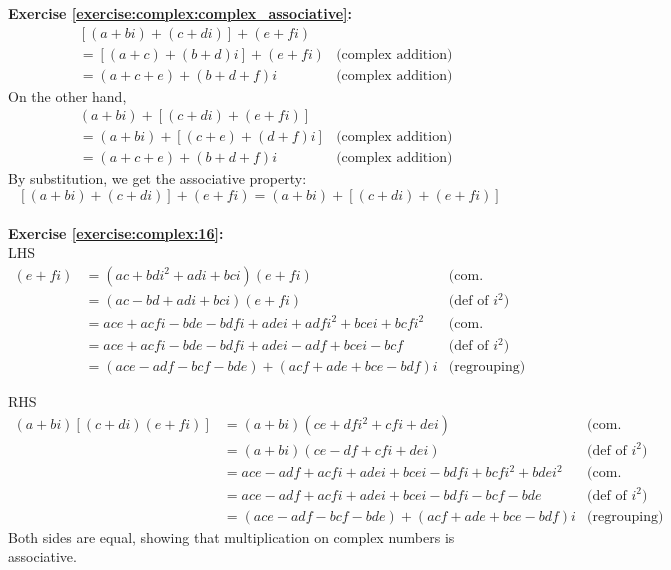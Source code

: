 \noindent\textbf{Exercise \ref{exercise:complex:complex_associative}:}
\begin{align*}
& [(a + bi) + (c + di)] + (e + fi) &\\
&=[(a + c) + (b + d)i] + (e + fi) &\text{(complex addition)}\\
&= (a + c + e) + (b + d + f)i &\text{(complex addition)}
\end{align*}
On the other hand,
\begin{align*}
&(a + bi) + [(c + di) + (e + fi)]&\\
 &= (a + bi) + [(c + e) + (d + f)i] &\text{(complex addition)}\\
&= (a + c + e) + (b + d + f)i &\text{(complex addition)}
\end{align*}
By substitution, we get the associative property:
\[[(a + bi) + (c + di)] + (e + fi) = (a + bi) + [(c + di) + (e + fi)] \] \\

\noindent\textbf{Exercise \ref{exercise:complex:16}:}
\\
LHS
\begin{align*}
[(a + bi)(c + di)](e + fi) &= (ac + bdi^{2} + adi + bci)(e + fi) &\text{(com. multi.)}\\
&= (ac - bd + adi + bci)(e + fi) &\text{(def of } i^{2})\\
&= ace + acfi - bde - bdfi + adei + adfi^{2} + bcei + bcfi^{2} &\text{(com. multi.)}\\
&= ace + acfi - bde - bdfi + adei - adf + bcei - bcf &\text{(def of } i^{2})\\
&= (ace - adf - bcf - bde) + (acf + ade + bce - bdf)i  &\text{(regrouping)}
\end{align*}

\noindent RHS
\begin{align*}
(a + bi)[(c + di)(e + fi)] &= (a + bi)(ce + dfi^{2} + cfi + dei) &\text{(com. multi.)}\\
&= (a + bi)(ce - df + cfi + dei) &\text{(def of } i^{2})\\
&= ace - adf + acfi + adei + bcei - bdfi + bcfi^{2} + bdei^{2} &\text{(com. multi.)}\\
&= ace - adf + acfi + adei + bcei - bdfi - bcf - bde &\text{(def of } i^{2})\\
&= (ace - adf - bcf - bde) + (acf + ade + bce - bdf)i  &\text{(regrouping)}
\end{align*}
Both sides are equal, showing that multiplication on complex numbers is associative.\\

